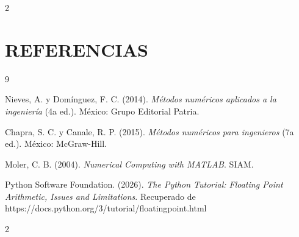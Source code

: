\documentclass{rmf-d}
\begin{document}
\begin{multicols}{2}
\section{REFERENCIAS}

\begin{thebibliography}{9}

Nieves, A. y Domínguez, F. C. (2014). \textit{Métodos numéricos aplicados a la ingeniería} (4a ed.). México: Grupo Editorial Patria.

Chapra, S. C. y Canale, R. P. (2015). \textit{Métodos numéricos para ingenieros} (7a ed.). México: McGraw-Hill.

Moler, C. B. (2004). \textit{Numerical Computing with MATLAB}. SIAM.

Python Software Foundation. (2026). \textit{The Python Tutorial: Floating Point Arithmetic, Issues and Limitations}. Recuperado de https://docs.python.org/3/tutorial/floatingpoint.html

\end{thebibliography}


























\end{multicols}
\medline
\begin{multicols}{2}

   
\printbibliography


\end{multicols}
\end{document}
